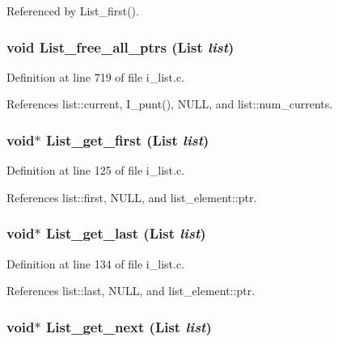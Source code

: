 Referenced by List\_\-first().
\subsubsection{\setlength{\rightskip}{0pt plus 5cm}void List\_\-free\_\-all\_\-ptrs (\bf{List} {\em list})}\label{i__list_8c_c28ce20fb755d89e8a8c87f77863a5ce}




Definition at line 719 of file i\_\-list.c.

References list::current, I\_\-punt(), NULL, and list::num\_\-currents.
\subsubsection{\setlength{\rightskip}{0pt plus 5cm}void$\ast$ List\_\-get\_\-first (\bf{List} {\em list})}\label{i__list_8c_8388a8373124b8aa52ad41d5c2aa156b}




Definition at line 125 of file i\_\-list.c.

References list::first, NULL, and list\_\-element::ptr.
\subsubsection{\setlength{\rightskip}{0pt plus 5cm}void$\ast$ List\_\-get\_\-last (\bf{List} {\em list})}\label{i__list_8c_704e244c8b364cf786092d245493d994}




Definition at line 134 of file i\_\-list.c.

References list::last, NULL, and list\_\-element::ptr.
\subsubsection{\setlength{\rightskip}{0pt plus 5cm}void$\ast$ List\_\-get\_\-next (\bf{List} {\em list})}\label{i__list_8c_6e1a5ec1a4d53a46a286632048be2034}




